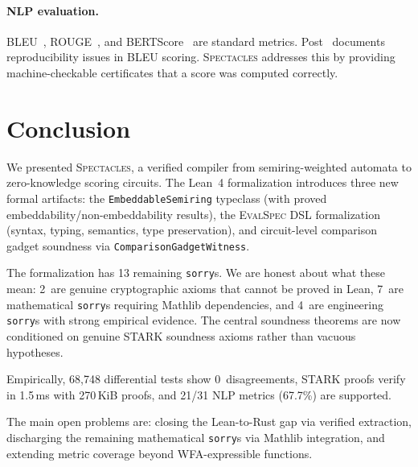 \documentclass[11pt]{article}
\newcommand{\spectacles}{\textsc{Spectacles}}
\newcommand{\evalspec}{\textsc{EvalSpec}}
\newcommand{\sorry}{\texttt{sorry}}
\begin{document}
\paragraph{NLP evaluation.}
BLEU~\cite{papineni2002bleu}, ROUGE~\cite{lin2004rouge}, and
BERTScore~\cite{zhang2020bertscore} are standard metrics.
Post~\cite{post2018bleu} documents reproducibility issues in BLEU
scoring.
\spectacles{} addresses this by providing machine-checkable
certificates that a score was computed correctly.


\section{Conclusion}\label{sec:conclusion}

We presented \spectacles{}, a verified compiler from semiring-weighted
automata to zero-knowledge scoring circuits.
The Lean~4 formalization introduces three new formal artifacts:
the \texttt{EmbeddableSemiring} typeclass (with proved
embeddability/non-embeddability results), the \evalspec{} DSL
formalization (syntax, typing, semantics, type preservation), and
circuit-level comparison gadget soundness via
\texttt{ComparisonGadgetWitness}.

The formalization has 13 remaining \sorry{}s.
We are honest about what these mean: 2~are genuine cryptographic
axioms that cannot be proved in Lean, 7~are mathematical \sorry{}s
requiring Mathlib dependencies, and 4~are engineering \sorry{}s
with strong empirical evidence.
The central soundness theorems are now conditioned on genuine STARK
soundness axioms rather than vacuous hypotheses.

Empirically, 68{,}748 differential tests show 0~disagreements,
STARK proofs verify in 1.5\,ms with 270\,KiB proofs, and 21/31
NLP metrics (67.7\%) are supported.

The main open problems are: closing the Lean-to-Rust gap via
verified extraction, discharging the remaining mathematical
\sorry{}s via Mathlib integration, and extending metric coverage
beyond WFA-expressible functions.
\end{document}
